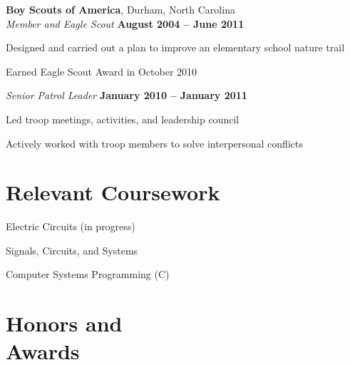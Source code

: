 \documentclass[margin,line,letterpaper]{resume}
\begin{document}
\begin{resume}
    \textbf{Boy Scouts of America}, Durham, North Carolina \vspace{2mm}\\\vspace{1mm}%
    \textsl{Member and Eagle Scout} \hfill \textbf{August 2004 -- June 2011}\vspace{-3mm}\\\vspace{-1mm}%
    \begin{list2}
    \item Designed and carried out a plan to improve an elementary school nature trail
    \item Earned Eagle Scout Award in October 2010
    \end{list2}\vspace{-1.5mm}

    \textsl{Senior Patrol Leader} \hfill \textbf{January 2010 -- January 2011}\vspace{-3mm}\\\vspace{-1mm}%
    \begin{list2}
    \item Led troop meetings, activities, and leadership council
    \item Actively worked with troop members to solve interpersonal conflicts
    \end{list2}\vspace{-1.5mm}


    \section{\mysidestyle Relevant Coursework}

    \begin{list2}
    \item Electric Circuits (in progress)
    \item Signals, Circuits, and Systems
    \item Computer Systems Programming (C)
    \end{list2}\vspace{-1.5mm}


    \section{\mysidestyle Honors and\\Awards} 


\end{resume}
\end{document}
